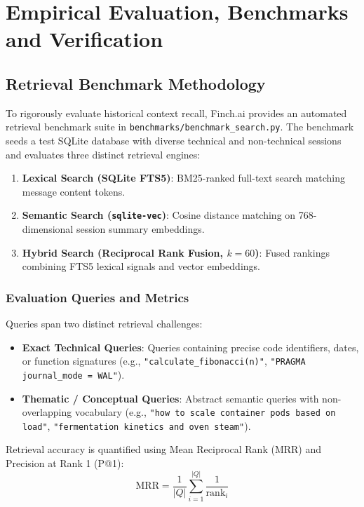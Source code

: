 \chapter{Empirical Evaluation, Benchmarks and Verification}
\label{chap:benchmarks}

\section{Retrieval Benchmark Methodology}
To rigorously evaluate historical context recall, Finch.ai provides an automated retrieval benchmark suite in \texttt{benchmarks/benchmark\_search.py}. The benchmark seeds a test SQLite database with diverse technical and non-technical sessions and evaluates three distinct retrieval engines:
\begin{enumerate}
    \item \textbf{Lexical Search (SQLite FTS5)}: BM25-ranked full-text search matching message content tokens.
    \item \textbf{Semantic Search (\texttt{sqlite-vec})}: Cosine distance matching on 768-dimensional session summary embeddings.
    \item \textbf{Hybrid Search (Reciprocal Rank Fusion, $k=60$)}: Fused rankings combining FTS5 lexical signals and vector embeddings.
\end{enumerate}

\subsection{Evaluation Queries and Metrics}
Queries span two distinct retrieval challenges:
\begin{itemize}
    \item \textbf{Exact Technical Queries}: Queries containing precise code identifiers, dates, or function signatures (e.g., \texttt{"calculate\_fibonacci(n)"}, \texttt{"PRAGMA journal\_mode = WAL"}).
    \item \textbf{Thematic / Conceptual Queries}: Abstract semantic queries with non-overlapping vocabulary (e.g., \texttt{"how to scale container pods based on load"}, \texttt{"fermentation kinetics and oven steam"}).
\end{itemize}

Retrieval accuracy is quantified using Mean Reciprocal Rank (MRR) and Precision at Rank 1 (P@1):
\begin{equation}
    \text{MRR} = \frac{1}{|Q|} \sum_{i=1}^{|Q|} \frac{1}{\text{rank}_i}
\end{equation}

